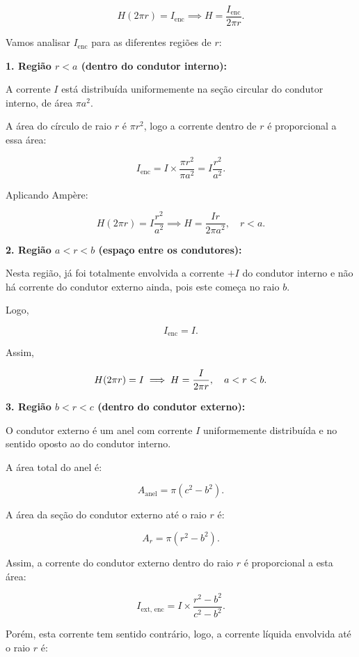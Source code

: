 \begin{flushleft}
\[
H (2 \pi r) = I_{\text{enc}} \implies H = \frac{I_{\text{enc}}}{2 \pi r}.
\]

Vamos analisar \(I_{\text{enc}}\) para as diferentes regiões de \(r\):

\vspace{0.3cm}
\textbf{1. Região \(r < a\) (dentro do condutor interno):}

A corrente \(I\) está distribuída uniformemente na seção circular do condutor interno, de área \(\pi a^2\).

A área do círculo de raio \(r\) é \(\pi r^2\), logo a corrente dentro de \(r\) é proporcional a essa área:

\[
I_{\text{enc}} = I \times \frac{\pi r^2}{\pi a^2} = I \frac{r^2}{a^2}.
\]

Aplicando Ampère:

\[
H (2 \pi r) = I \frac{r^2}{a^2} \implies H = \frac{I r}{2 \pi a^2}, \quad r < a.
\]

\vspace{0.3cm}
\textbf{2. Região \(a < r < b\) (espaço entre os condutores):}

Nesta região, já foi totalmente envolvida a corrente \(+I\) do condutor interno e não há corrente do condutor externo ainda, pois este começa no raio \(b\).

Logo,

\[
I_{\text{enc}} = I.
\]

Assim,

\[
H (2 \pi r) = I \implies H = \frac{I}{2 \pi r}, \textrm{\quad \(a < r < b\)}.
\]

\vspace{0.3cm}
\textbf{3. Região \(b < r < c\) (dentro do condutor externo):}

O condutor externo é um anel com corrente \(I\) uniformemente distribuída e no sentido oposto ao do condutor interno. 

A área total do anel é:

\[
A_{\text{anel}} = \pi (c^2 - b^2).
\]

A área da seção do condutor externo até o raio \(r\) é:

\[
A_r = \pi (r^2 - b^2).
\]

Assim, a corrente do condutor externo dentro do raio \(r\) é proporcional a esta área:

\[
I_{\text{ext, enc}} = I \times \frac{r^2 - b^2}{c^2 - b^2}.
\]

Porém, esta corrente tem sentido contrário, logo, a corrente líquida envolvida até o raio \(r\) é:


\end{flushleft}
